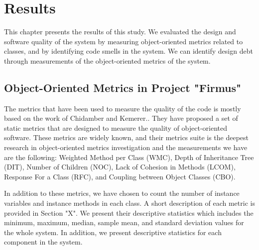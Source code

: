 
\chapter{Results}
\label{chap:results}
This chapter presents the results of this study. We evaluated the design and software quality of the system by measuring object-oriented metrics related to classes, and by identifying code smells in the system.
We can identify design debt through measurements of the object-oriented metrics of the system.  







\section{Object-Oriented Metrics in Project "Firmus"}
\label{sec:oometricsFirmus}
The metrics that have been used to measure the quality of the code is mostly based on the work of Chidamber and Kemerer.\cite{chidamber1994metrics}. They have proposed a set of static metrics that are designed to measure the quality of object-oriented software. These metrics are widely known, and their metrics suite is the deepest research in object-oriented metrics investigation and the measurements we have are the following: Weighted Method per Class (WMC), Depth of Inheritance Tree (DIT), Number of Children (NOC), Lack of Cohesion in Methods (LCOM), Response For a Class (RFC), and Coupling between Object Classes (CBO). 


In addition to these metrics, we have chosen to count the number of instance variables and instance methods in each class. A short description of each metric is provided in Section "X". We present their descriptive statistics which includes the minimum, maximum, median, sample mean, and standard deviation values for the whole system. In addition, we present descriptive statistics for each component in the system.

